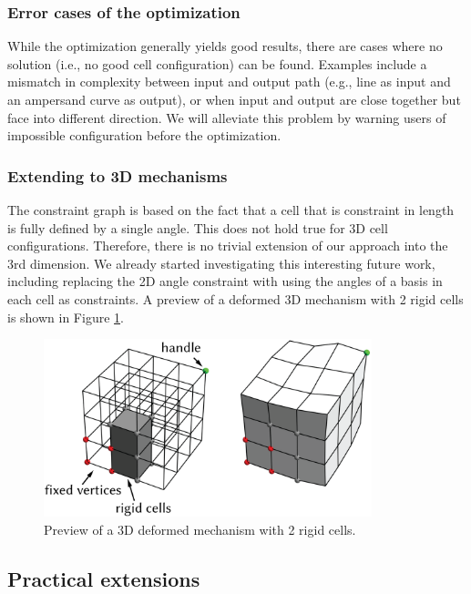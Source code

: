 \subsubsection{Error cases of the optimization}
While the optimization generally yields good results, there are cases where no solution (i.e., no good cell configuration) can be found. Examples include a mismatch in complexity between input and output path (e.g., line as input and an ampersand curve as output), or when input and output are close together but face into different direction. We will alleviate this problem by warning users of impossible configuration before the optimization. 

\subsubsection{Extending to 3D mechanisms}
The constraint graph is based on the fact that a cell that is constraint in length is fully defined by a single angle. This does not hold true for 3D cell configurations. Therefore, there is no trivial extension of our approach into the 3rd dimension. We already started investigating this interesting future work, including replacing the 2D angle constraint with using the angles of a basis in each cell as constraints. A preview of a deformed 3D mechanism with 2 rigid cells is shown in Figure \ref{fig:19-3D-grid}.

\begin{figure} [h]
    \centering
    \includegraphics[width=0.85\textwidth]{chapters/understanding-metamaterial-mechanisms-FIG/19-3D-grid.png}
    \caption[Short figure name.]{Preview of a 3D deformed mechanism with 2 rigid cells.
    \label{fig:19-3D-grid}}
\end{figure}


\subsection{Practical extensions}

